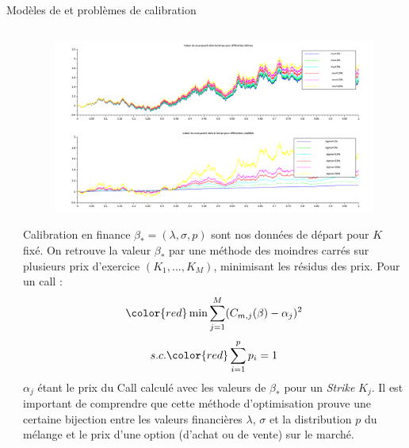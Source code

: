 \documentclass[final]{beamer}
\newlength{\onecolwid}
\newlength{\twocolwid}
\begin{document}
\begin{frame}[t]
\begin{columns}[t]
\begin{column}{\twocolwid}
\begin{block}{Modèles de  et problèmes de calibration}
\begin{columns}[t,totalwidth=\twocolwid]
\begin{column}{\onecolwid}
\end{column} %

\begin{column}{\onecolwid} %

\begin{figure}[!H]
  \centerline{\includegraphics[scale=0.65]{bs_actif_mopsi.png}}

\end{figure}

\vspace{0.3cm}
\begin{alertblock}{Calibration en finance}
  $ \beta_* = (\lambda,\sigma,p)$ sont nos données de départ pour $K$ fixé.
  \newline
  On retrouve la valeur $\beta_*$ par une méthode des moindres carrés sur plusieurs prix d'exercice $(K_1,...,K_M)$, minimisant les résidus des prix. \newline
  Pour un call :
  \[{\color{red} \min \sum^M_{j=1} (C_{m,j}(\beta)-\alpha_j)^2} \]
  \vspace{-0.4cm}
  \[ s.c. {\color{red} \sum^p_{i=1}p_i = 1} \]
$\alpha_j$ étant le prix du Call calculé avec les valeurs de $\beta_*$ pour un \textit{Strike} $K_j$.
\newline
Il est important de comprendre que cette méthode d'optimisation prouve une certaine bijection entre les valeurs financières $\lambda$, $\sigma$ et la distribution $p$ du mélange et le prix d'une option (d'achat ou de vente) sur le marché.
\end{alertblock}
\end{column} %


\end{columns}
\end{block}
\end{column}
\end{columns}
\end{frame}
\end{document}
